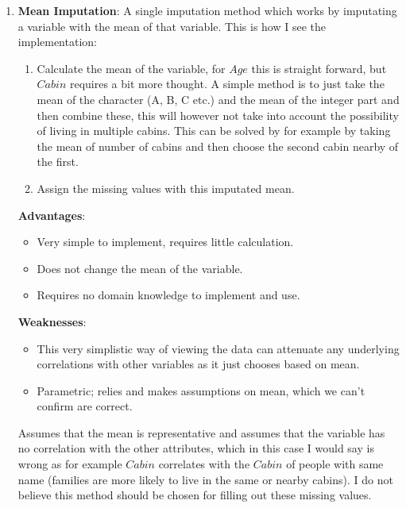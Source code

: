 \documentclass[11pt, english]{../Template/NTNUoving}
\begin{document}
\begin{oppgave}
\begin{enumerate}
        \item \textbf{Mean Imputation}\cite{mean}: A single imputation method which works by imputating a variable with the mean of that variable.
        This is how I see the implementation:
        \begin{enumerate}[label=\arabic*]
            \item Calculate the mean of the variable, for $Age$ this is straight forward, but $Cabin$ requires a bit more thought. A simple method is to just
            take the mean of the character (A, B, C etc.) and the mean of the integer part and then combine these, this will however not take into account the possibility of living in multiple cabins.
            This can be solved by for example by taking the mean of number of cabins and then choose the second cabin nearby of the first.
            \item Assign the missing values with this imputated mean.
        \end{enumerate}
        \textbf{Advantages}:
        \begin{itemize}
            \item Very simple to implement, requires little calculation.
            \item Does not change the mean of the variable.
            \item Requires no domain knowledge to implement and use.
        \end{itemize}
        \textbf{Weaknesses}:
        \begin{itemize}
            \item This very simplistic way of viewing the data can attenuate any underlying correlations with other variables as it just chooses based on mean.
            \item Parametric; relies and makes assumptions on mean, which we can't confirm are correct.
        \end{itemize}
        Assumes that the mean is representative and assumes that the variable has no correlation with the other attributes, which in this case I would say is wrong
        as for example $Cabin$ correlates with the $Cabin$ of people with same name (families are more likely to live in the same or nearby cabins).
        I do not believe this method should be chosen for filling out these missing values.


\end{enumerate}
\end{oppgave}
\end{document}
